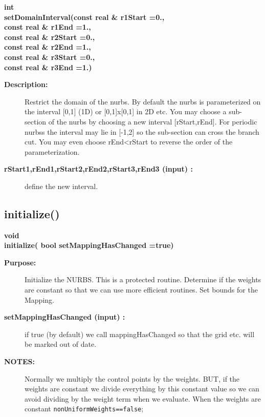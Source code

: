 \begin{flushleft} \textbf{%
int   \\ 
\settowidth{\NurbsMappingIncludeArgIndent}{setDomainInterval(}%
setDomainInterval(const real \& r1Start  =0., \\ 
\hspace{\NurbsMappingIncludeArgIndent}const real \& r1End  =1.,\\ 
\hspace{\NurbsMappingIncludeArgIndent}const real \& r2Start  =0., \\ 
\hspace{\NurbsMappingIncludeArgIndent}const real \& r2End  =1.,\\ 
\hspace{\NurbsMappingIncludeArgIndent}const real \& r3Start  =0., \\ 
\hspace{\NurbsMappingIncludeArgIndent}const real \& r3End  =1.)
}\end{flushleft}
\begin{description}
\item[{\bf Description:}] 
 Restrict the domain of the nurbs.
 By default the nurbs is parameterized on the interval [0,1] (1D) or [0,1]x[0,1] in 2D etc.
 You may choose a sub-section of the nurbs by choosing a new interval [rStart,rEnd].
 For periodic nurbss the interval may lie in [-1,2] so the sub-section can cross the branch cut.
 You may even choose rEnd<rStart to reverse the order of the parameterization.
\item[{\bf rStart1,rEnd1,rStart2,rEnd2,rStart3,rEnd3 (input) :}]  define the new interval.
\end{description}
\subsection{initialize()}
 
\begin{flushleft} \textbf{%
void  \\ 
\settowidth{\NurbsMappingIncludeArgIndent}{initialize(}%
initialize( bool setMappingHasChanged  =true)
}\end{flushleft}
\begin{description}
\item[{\bf Purpose:}]  Initialize the NURBS. This is a protected routine.
 Determine if the weights are constant so
 that we can use more efficient routines. Set bounds for the Mapping.

\item[{\bf setMappingHasChanged (input) :}]  if true (by default) we call mappingHasChanged so that the grid etc. will be marked
                  out of date. 
\item[{\bf NOTES:}]  Normally we multiply the control points by the weights.
     BUT,  if the weights are constant we divide everything by this constant value so
 we can avoid dividing by the weight term when we evaluate. When the weights are
 constant {\tt nonUniformWeights==false};
\end{description}

